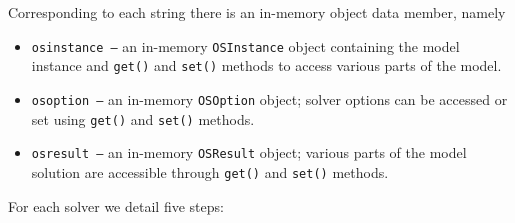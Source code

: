 Corresponding to each string there is an in-memory object data member, namely

\begin{itemize}
\item {\tt osinstance --}  an in-memory {\tt OSInstance} object containing the model instance
and {\tt get()} and {\tt set()} methods to access various parts of the model.


\item {\tt osoption --} an in-memory {\tt OSOption} object; solver options can be accessed or 
set using  {\tt get()} and {\tt set()} methods.


\item {\tt osresult --}  an in-memory {\tt OSResult} object; various parts of the model solution  
are accessible through  {\tt get()} and {\tt set()} methods.
\end{itemize}


For each solver we detail five steps:

